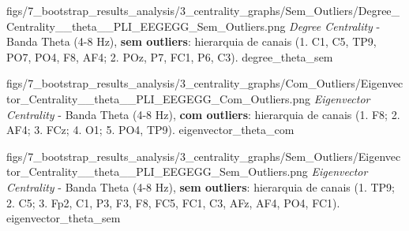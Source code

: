 \ultrawidefigure
  {figs/7_bootstrap_results_analysis/3_centrality_graphs/Sem_Outliers/Degree_Centrality__theta__PLI_EEGEGG_Sem_Outliers.png}
  {\textit{Degree Centrality} - Banda Theta (4-8 Hz), \textbf{sem outliers}: hierarquia de canais (1. C1, C5, TP9, PO7, PO4, F8, AF4; 2. POz, P7, FC1, P6, C3).}
  {degree_theta_sem}


\ultrawidefigure
  {figs/7_bootstrap_results_analysis/3_centrality_graphs/Com_Outliers/Eigenvector_Centrality__theta__PLI_EEGEGG_Com_Outliers.png}
  {\textit{Eigenvector Centrality} - Banda Theta (4-8 Hz), \textbf{com outliers}: hierarquia de canais (1. F8; 2. AF4; 3. FCz; 4. O1; 5. PO4, TP9).}
  {eigenvector_theta_com}

\ultrawidefigure
  {figs/7_bootstrap_results_analysis/3_centrality_graphs/Sem_Outliers/Eigenvector_Centrality__theta__PLI_EEGEGG_Sem_Outliers.png}
  {\textit{Eigenvector Centrality} - Banda Theta (4-8 Hz), \textbf{sem outliers}: hierarquia de canais (1. TP9; 2. C5; 3. Fp2, C1, P3, F3, F8, FC5, FC1, C3, AFz, AF4, PO4, FC1).}
  {eigenvector_theta_sem}